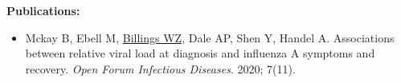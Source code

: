 \textbf{Publications:}

\begin{itemize}[noitemsep]
\item Mckay B, Ebell M, \ul{Billings WZ}, Dale AP, Shen Y, Handel A. Associations between relative viral load at diagnosis and influenza A symptoms and recovery. \textit{Open Forum Infectious Diseases}. 2020; 7(11).
\end{itemize}